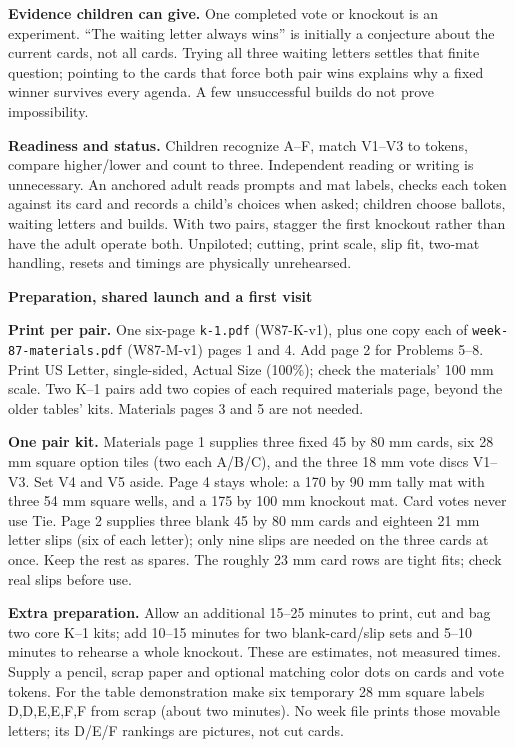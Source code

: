 \documentclass[11pt]{article}
\newcommand{\head}[1]{\par\textbf{\large #1}\par}
\begin{document}
\textbf{Evidence children can give.} One completed vote or knockout is an experiment. ``The waiting letter always wins'' is initially a conjecture about the current cards, not all cards. Trying all three waiting letters settles that finite question; pointing to the cards that force both pair wins explains why a fixed winner survives every agenda. A few unsuccessful builds do not prove impossibility.

\textbf{Readiness and status.} Children recognize A--F, match V1--V3 to tokens, compare higher/lower and count to three. Independent reading or writing is unnecessary. An anchored adult reads prompts and mat labels, checks each token against its card and records a child's choices when asked; children choose ballots, waiting letters and builds. With two pairs, stagger the first knockout rather than have the adult operate both. Unpiloted; cutting, print scale, slip fit, two-mat handling, resets and timings are physically unrehearsed.

\newpage
\head{Preparation, shared launch and a first visit}
\textbf{Print per pair.} One six-page \texttt{k-1.pdf} (W87-K-v1), plus one copy each of \texttt{week-87-materials.pdf} (W87-M-v1) pages 1 and 4. Add page 2 for Problems 5--8. Print US Letter, single-sided, Actual Size (100\%); check the materials' 100 mm scale. Two K--1 pairs add two copies of each required materials page, beyond the older tables' kits. Materials pages 3 and 5 are not needed.

\textbf{One pair kit.} Materials page 1 supplies three fixed 45 by 80 mm cards, six 28 mm square option tiles (two each A/B/C), and the three 18 mm vote discs V1--V3. Set V4 and V5 aside. Page 4 stays whole: a 170 by 90 mm tally mat with three 54 mm square wells, and a 175 by 100 mm knockout mat. Card votes never use Tie. Page 2 supplies three blank 45 by 80 mm cards and eighteen 21 mm letter slips (six of each letter); only nine slips are needed on the three cards at once. Keep the rest as spares. The roughly 23 mm card rows are tight fits; check real slips before use.

\textbf{Extra preparation.} Allow an additional 15--25 minutes to print, cut and bag two core K--1 kits; add 10--15 minutes for two blank-card/slip sets and 5--10 minutes to rehearse a whole knockout. These are estimates, not measured times. Supply a pencil, scrap paper and optional matching color dots on cards and vote tokens. For the table demonstration make six temporary 28 mm square labels D,D,E,E,F,F from scrap (about two minutes). No week file prints those movable letters; its D/E/F rankings are pictures, not cut cards.
\end{document}
